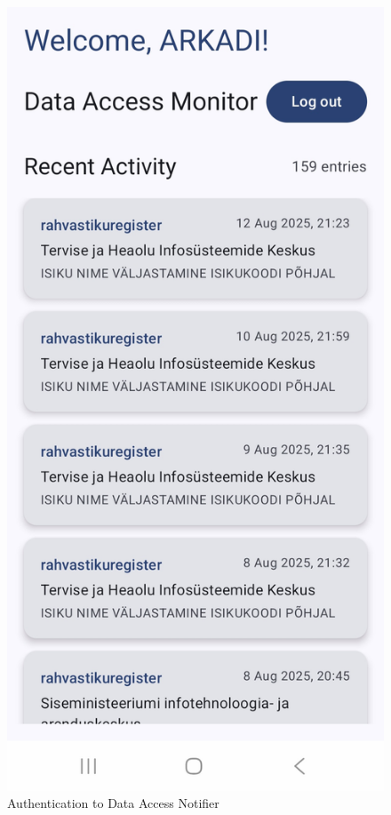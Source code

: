 \begin{figure}[H]
\begin{minipage}{0.32\textwidth}
\end{minipage}%
\hfill
\begin{minipage}{0.32\textwidth}
    \centering
    \includegraphics[width=\textwidth]{english/figures/Screenshot_20250812_212336_Data Access Notifier.jpg}
\end{minipage}
\caption{Authentication to Data Access Notifier}
\label{fig:app-usage}
\end{figure} 

